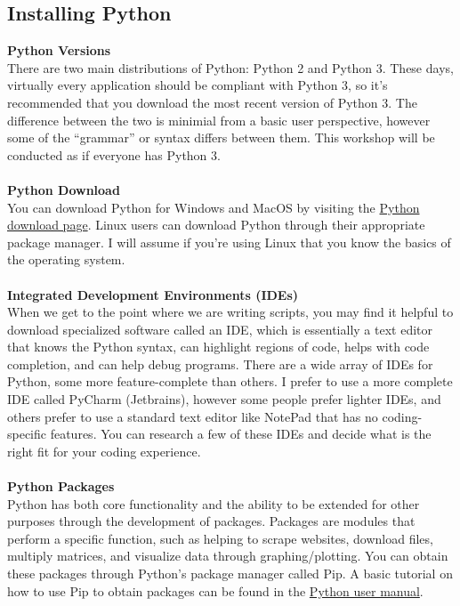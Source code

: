 \documentclass[a4paper,11pt]{article}
\begin{document}
\subsection{Installing Python}
\textbf{Python Versions} \\
There are two main distributions of Python: Python 2 and Python 3.  These days, virtually every application should be
compliant with Python 3, so it's recommended that you download the most recent version of Python 3.  The difference
between the two is minimial from a basic user perspective, however some of the ``grammar'' or syntax differs
between them.  This workshop will be conducted as if everyone has Python 3. \\
\\
\textbf{Python Download} \\
You can download Python for Windows and MacOS by visiting the \href{https://www.python.org/downloads}{Python download page}.
Linux users can download Python through their appropriate package manager.  I will assume if you're using Linux that you
know the basics of the operating system.\\
\\
\textbf{Integrated Development Environments (IDEs)} \\
When we get to the point where we are writing scripts, you may find it helpful to download specialized software called an
IDE, which is essentially a text editor that knows the Python syntax, can highlight regions of code, helps with code
completion, and can help debug programs.  There are a wide array of IDEs for Python, some more feature-complete than others.  
I prefer to use a
more complete IDE called PyCharm (Jetbrains),  however some people prefer lighter IDEs, and others prefer to use a standard
text editor like NotePad that has no coding-specific features.  You can research a few of these IDEs and decide what is
the right fit for your coding experience. \\
\\
\textbf{Python Packages} \\
Python has both core functionality and the ability to be extended for other purposes through the development of packages.
Packages are modules that perform a specific function, such as helping to scrape websites, download files, multiply matrices,
and visualize data through graphing/plotting.  You can obtain these packages through Python's package manager called Pip.
A basic tutorial on how to use Pip to obtain packages can be found in the \href{https://packaging.python.org/tutorials/installing-packages/}{Python user manual}.
\end{document}
